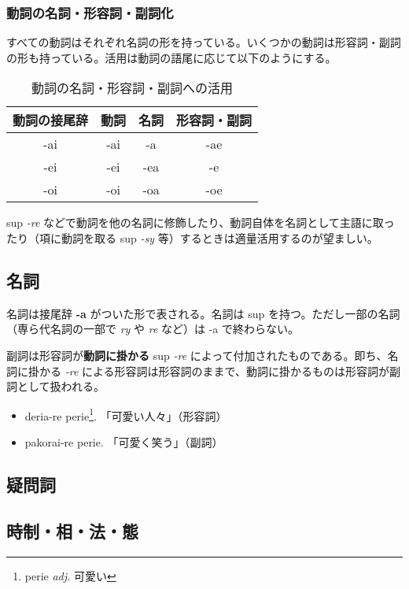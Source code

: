 \subsubsection{動詞の名詞・形容詞・副詞化}

すべての動詞はそれぞれ名詞の形を持っている。いくつかの動詞は形容詞・副詞の形も持っている。活用は動詞の語尾に応じて以下のようにする。

\begin{table}[h]
    \centering
    \caption{動詞の名詞・形容詞・副詞への活用}
    \begin{tabular}{cccc}
        \hline
        動詞の接尾辞 & 動詞 & 名詞 & 形容詞・副詞 \\
        \hline \hline
        -ai & -ai & -a  & -ae \\
        -ei & -ei & -ea & -e  \\
        -oi & -oi & -oa & -oe \\
        \hline
    \end{tabular}
\end{table}

sup \emph{-re} などで動詞を他の名詞に修飾したり、動詞自体を名詞として主語に取ったり（項に動詞を取る sup \emph{-sy} 等）するときは適量活用するのが望ましい。

\subsection{名詞}

名詞は接尾辞 \textbf{-a} がついた形で表される。名詞は sup を持つ。ただし一部の名詞（専ら代名詞の一部で \emph{ry} や \emph{re} など）は -a で終わらない。

副詞は形容詞が\textbf{動詞に掛かる} sup \emph{-re} によって付加されたものである。即ち、名詞に掛かる \emph{-re} による形容詞は形容詞のままで、動詞に掛かるものは形容詞が副詞として扱われる。

\begin{itemize}
    \item deria-re perie\footnote{perie \emph{adj.} 可愛い}. 「可愛い人々」（形容詞）
    \item pakorai-re perie. 「可愛く笑う」（副詞）
\end{itemize}

\subsection{疑問詞}

\subsection{時制・相・法・態}

